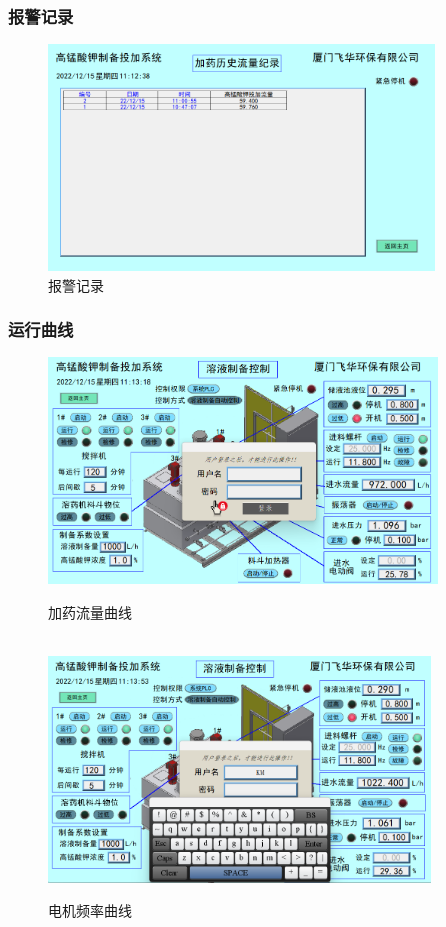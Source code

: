 \documentclass[UTF8,a4paper,12pt,titlepage]{ctexart}
\begin{document}
        \subsubsection{报警记录}
            \begin{figure}[h]
                \centering
                \includegraphics[height=6cm]{g12.png}
                \caption{报警记录}\label{fig:g15}
            \end{figure}

        \newpage

        \subsubsection{运行曲线}
            \begin{figure}[h]
                \centering
                \includegraphics[height=6cm]{g13.png}
                \caption{加药流量曲线}\label{fig:g16}
               \quad\\ 
                \includegraphics[height=6cm]{g14.png}
                \caption{电机频率曲线}\label{fig:g17}
            \end{figure}
\end{document}
